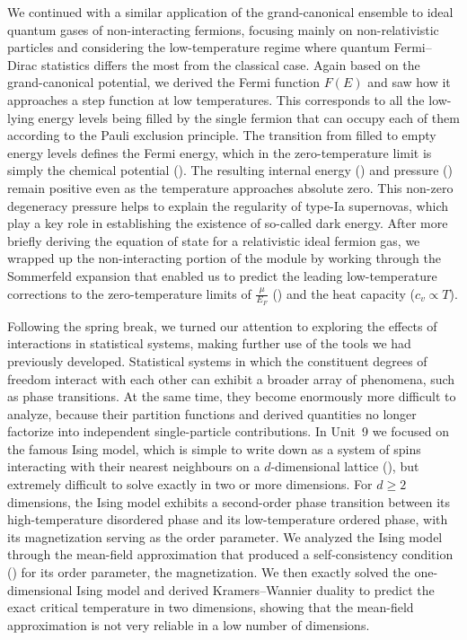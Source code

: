 We continued with a similar application of the grand-canonical ensemble to ideal quantum gases of non-interacting fermions, focusing mainly on non-relativistic particles and considering the low-temperature regime where quantum Fermi--Dirac statistics differs the most from the classical case.
Again based on the grand-canonical potential, we derived the Fermi function $F(E)$ and saw how it approaches a step function at low temperatures.
This corresponds to all the low-lying energy levels being filled by the single fermion that can occupy each of them according to the Pauli exclusion principle.
The transition from filled to empty energy levels defines the Fermi energy, which in the zero-temperature limit is simply the chemical potential ().
The resulting internal energy () and pressure () remain positive even as the temperature approaches absolute zero.
This non-zero degeneracy pressure helps to explain the regularity of type-Ia supernovas, which play a key role in establishing the existence of so-called dark energy.
After more briefly deriving the equation of state for a relativistic ideal fermion gas, we wrapped up the non-interacting portion of the module by working through the Sommerfeld expansion that enabled us to predict the leading low-temperature corrections to the zero-temperature limits of $\frac{\mu}{E_F}$ () and the heat capacity ($c_v \propto T$).

Following the spring break, we turned our attention to exploring the effects of interactions in statistical systems, making further use of the tools we had previously developed.
Statistical systems in which the constituent degrees of freedom interact with each other can exhibit a broader array of phenomena, such as phase transitions.
At the same time, they become enormously more difficult to analyze, because their partition functions and derived quantities no longer factorize into independent single-particle contributions.
In Unit~9 we focused on the famous Ising model, which is simple to write down as a system of spins interacting with their nearest neighbours on a $d$-dimensional lattice (), but extremely difficult to solve exactly in two or more dimensions.
For $d \geq 2$ dimensions, the Ising model exhibits a second-order phase transition between its high-temperature disordered phase and its low-temperature ordered phase, with its magnetization serving as the order parameter.
We analyzed the Ising model through the mean-field approximation that produced a self-consistency condition () for its order parameter, the magnetization.
We then exactly solved the one-dimensional Ising model and derived Kramers--Wannier duality to predict the exact critical temperature in two dimensions, showing that the mean-field approximation is not very reliable in a low number of dimensions.

